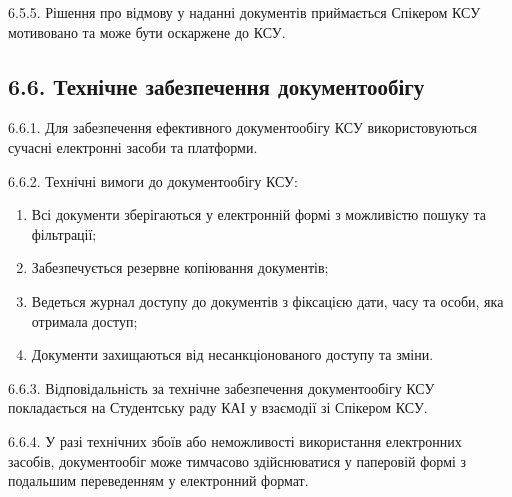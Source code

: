     6.5.5. Рішення про відмову у наданні документів приймається Спікером КСУ мотивовано та може бути оскаржене до КСУ.

\subsection*{6.6. Технічне забезпечення документообігу}
    6.6.1. Для забезпечення ефективного документообігу КСУ використовуються сучасні електронні засоби та платформи.

    6.6.2. Технічні вимоги до документообігу КСУ:

        \begin{enumerate}[label=\alph*)]
            \item Всі документи зберігаються у електронній формі з можливістю пошуку та фільтрації;
            \item Забезпечується резервне копіювання документів;
            \item Ведеться журнал доступу до документів з фіксацією дати, часу та особи, яка отримала доступ;
            \item Документи захищаються від несанкціонованого доступу та зміни.
        \end{enumerate}

    6.6.3. Відповідальність за технічне забезпечення документообігу КСУ покладається на Студентську раду КАІ у взаємодії зі Спікером КСУ.

    6.6.4. У разі технічних збоїв або неможливості використання електронних засобів, документообіг може тимчасово здійснюватися у паперовій формі з подальшим переведенням у електронний формат.